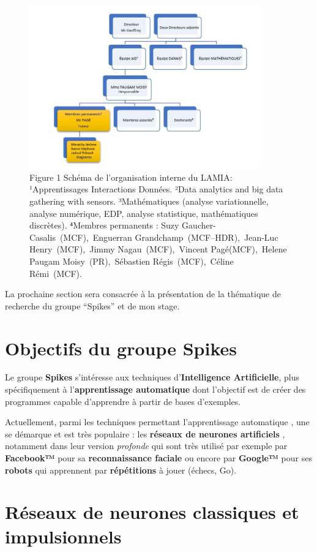 \begin{figure}[h!]
\centering
\includegraphics[width=10cm]{./images/orga.jpg}
\caption{Figure 1 Schéma de l'organisation interne du LAMIA:
¹Apprentissages Interactions Données. ²Data analytics and big data
gathering with sensors. ³Mathématiques (analyse variationnelle, analyse
numérique, EDP, analyse statistique, mathématiques discrètes). ⁴Membres
permanents : Suzy Gaucher-Casalis~(MCF),~Enguerran
Grandchamp~(MCF--HDR),~Jean-Luc Henry~(MCF),~Jimmy Nagau~(MCF),~Vincent
Pagé(MCF),~Helene Paugam Moisy~(PR),~Sébastien Régis~(MCF),~Céline
Rémi~(MCF).}
\end{figure}

La prochaine section sera consacrée à la présentation de la thématique
de recherche du groupe ``Spikes'' et de mon stage.


\hypertarget{Objectif_Spike}{%
\section{Objectifs du groupe Spikes}\label{Objectif_Spike}}

Le groupe \textbf{Spikes} s'intéresse aux techniques
d'\textbf{Intelligence Artificielle}, plus spécifiquement à
l'\textbf{apprentissage automatique} dont l'objectif est de créer des
programmes capable d'apprendre à partir de bases d'exemples.

Actuellement, parmi les techniques permettant l'apprentissage
automatique , une se démarque et est très populaire : les
\textbf{réseaux de neurones artificiels} , notamment dans leur version
\emph{profonde} qui sont très utilisé par exemple par \textbf{Facebook™}
pour sa \textbf{reconnaissance faciale} ou encore par \textbf{Google™}
pour ses \textbf{robots} qui apprennent par \textbf{répétitions} à jouer
(échecs, Go).

\hypertarget{ruxe9seaux-de-neurones-classiques-et-impulsionnels}{%
\section{Réseaux de neurones classiques et
impulsionnels}\label{ruxe9seaux-de-neurones-classiques-et-impulsionnels}}

